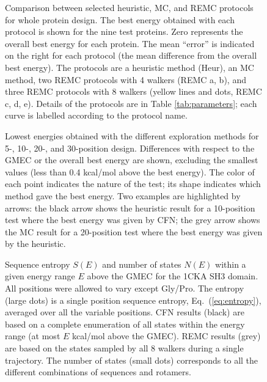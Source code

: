 \documentclass[a4paper,12pt]{article}
\begin{document}
\begin{figure}[!h]
\caption{\small 
Comparison between selected heuristic, MC, and REMC protocols for whole protein design.
The best energy obtained with each protocol is shown for the nine test proteins. Zero represents
the overall best energy for each protein. The mean ``error'' is indicated on the right for each protocol
(the mean difference from the overall best energy). The protocols are a heuristic method (Heur), an MC
method, two REMC protocols with 4 walkers (REMC a, b), and three REMC protocols with 8 walkers (yellow
lines and dots, REMC c, d, e). Details of the protocols are in Table \ref{tab:parameters}; each curve
is labelled according to the protocol name.
}
\end{figure}


\begin{figure}[!h]
\caption[width=1cm]{\small 
Lowest energies obtained with the different exploration methods for 5-, 10-, 20-, and 30-position design. Differences
with respect to the GMEC or the overall best energy are shown, excluding the smallest values (less than 0.4 kcal/mol
above the best energy). The color of each point indicates the nature of the test; its shape indicates which method
gave the best energy. Two examples are highlighted by arrows: the black arrow shows the heuristic result for a
10-position test where the best energy was given by CFN; the grey arrow shows the MC result for a 20-position test
where the best energy was given by the heuristic.
}
\end{figure}


\begin{figure}[!h]
\caption[width=1cm]{\small 
Sequence entropy $S(E)$ and number of states $N(E)$ within a given energy range $E$ above the GMEC for the 1CKA
SH3 domain. All positions were allowed to vary except Gly/Pro. The entropy (large dots) is a single position
sequence entropy, Eq.\ (\ref{eq:entropy}), averaged over all the variable positions. CFN results (black) are based
on a complete enumeration of all states within the energy range (at most $E$ kcal/mol above the GMEC). REMC results
(grey) are based on the states sampled by all 8 walkers during a single trajectory. The number of states (small dots)
corresponds to all the different combinations of sequences and rotamers.
}
\end{figure}
\end{document}
